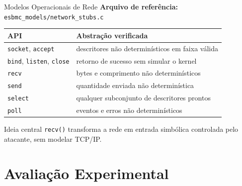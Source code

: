 \documentclass[10pt,aspectratio=169]{beamer}
\begin{document}
\begin{frame}{Modelos Operacionais de Rede}
    \textbf{Arquivo de refer\^encia:} \texttt{esbmc\_models/network\_stubs.c}

    \vspace{0.4em}
    \begin{tabular}{p{3.0cm}p{8.0cm}}
        \toprule
        API & Abstra\c{c}\~ao verificada \\
        \midrule
        \texttt{socket}, \texttt{accept} & descritores n\~ao determin\'isticos em faixa v\'alida \\
        \texttt{bind}, \texttt{listen}, \texttt{close} & retorno de sucesso sem simular o kernel \\
        \texttt{recv} & bytes e comprimento n\~ao determin\'isticos \\
        \texttt{send} & quantidade enviada n\~ao determin\'istica \\
        \texttt{select} & qualquer subconjunto de descritores prontos \\
        \texttt{poll} & eventos e erros n\~ao determin\'isticos \\
        \bottomrule
    \end{tabular}

    \vspace{0.5em}
    \begin{block}{Ideia central}
        \texttt{recv()} transforma a rede em entrada simb\'olica controlada pelo
        atacante, sem modelar TCP/IP.
    \end{block}
\end{frame}

\section{Avalia\c{c}\~ao Experimental}
\end{document}
